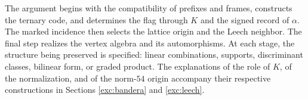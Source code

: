 The argument begins with the compatibility of prefixes and frames,
constructs the ternary code, and determines the flag through \(K\) and the
signed record of \(\alpha\). The marked incidence then selects the lattice
origin and the Leech neighbor. The final step realizes the vertex algebra and
its automorphisms. At each stage, the structure being preserved is specified:
linear combinations, supports, discriminant classes, bilinear form, or graded
product. The explanations of the role of \(K\), of the normalization, and of
the norm-\(54\) origin accompany their respective constructions in
Sections \ref{exc:bandera} and \ref{exc:leech}.
